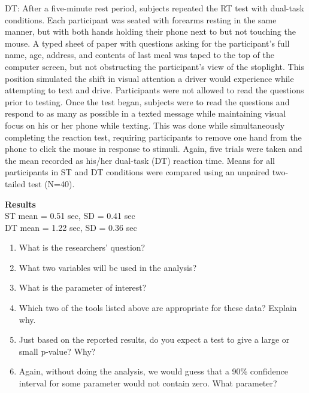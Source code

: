 \begin{list}{}{}
\begin{list}{}{}
    DT: After a five-minute rest period, subjects repeated the RT test
    with dual-task conditions. Each participant was seated with
    forearms resting in the same manner, but with both hands holding
    their phone next to but not touching the mouse. A typed sheet of
    paper with questions asking for the participant’s full name, age,
    address, and contents of last meal was taped to the top of the
    computer screen, but not obstructing the participant’s view of the
    stoplight.  This position simulated the shift in visual attention
    a driver would experience while attempting to text and
    drive. Participants were not allowed to read the questions prior
    to testing. Once the test began, subjects were to read the
    questions and respond to as many as possible in a texted message
    while maintaining visual focus on his or her phone while
    texting. This was done while simultaneously completing the
    reaction test, requiring participants to remove one hand from the
    phone to click the mouse in response to stimuli. Again, five
    trials were taken and the mean recorded as his/her dual-task (DT)
    reaction time.  Means for all participants in ST and DT conditions
    were compared using an unpaired two-tailed test (N=40).
  \item [\bf  Results]\ \ \\
   ST mean = 0.51 sec, SD = 0.41 sec\\
   DT mean = 1.22 sec, SD = 0.36 sec
 \end{list}
   \begin{enumerate}
   \item What is the researchers' question?\vspace{1cm}
   \item What two variables will be used in the analysis?\vspace{1cm}
   \item What is the parameter of interest?\vspace{1cm}
   \item Which two of the tools listed above are appropriate for these
     data? Explain why.\vspace{2cm}
   \item Just based on the reported results, do you expect a test to
     give a large or small p-value?  Why?\vspace{1cm}
   \item Again, without doing the analysis, we would guess that a 90\%
     confidence interval for some parameter would not contain zero.  What
     parameter? \vspace{1cm}
  \end{enumerate}


\end{list}
